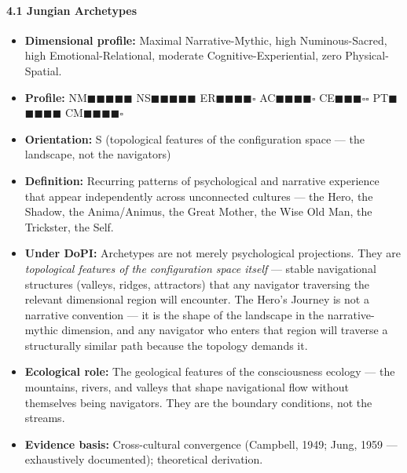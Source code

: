 \paragraph*{4.1 Jungian Archetypes}

\begin{itemize}[nosep,leftmargin=*]
  \item \textbf{Dimensional profile:} Maximal Narrative-Mythic, high Numinous-Sacred, high Emotional-Relational, moderate Cognitive-Experiential, zero Physical-Spatial.
  \item \textbf{Profile:} NM$\blacksquare$$\blacksquare$$\blacksquare$$\blacksquare$$\blacksquare$ NS$\blacksquare$$\blacksquare$$\blacksquare$$\blacksquare$$\blacksquare$ ER$\blacksquare$$\blacksquare$$\blacksquare$$\blacksquare$$\square$ AC$\blacksquare$$\blacksquare$$\blacksquare$$\blacksquare$$\square$ CE$\blacksquare$$\blacksquare$$\blacksquare$$\square$$\square$ PT$\blacksquare$$\blacksquare$$\blacksquare$$\blacksquare$$\blacksquare$ CM$\blacksquare$$\blacksquare$$\blacksquare$$\blacksquare$$\square$
  \item \textbf{Orientation:} S (topological features of the configuration space — the landscape, not the navigators)
  \item \textbf{Definition:} Recurring patterns of psychological and narrative experience that appear independently across unconnected cultures — the Hero, the Shadow, the Anima/\allowbreak Animus, the Great Mother, the Wise Old Man, the Trickster, the Self.
  \item \textbf{Under DoPI:} Archetypes are not merely psychological projections. They are \textit{topological features of the configuration space itself} — stable navigational structures (valleys, ridges, attractors) that any navigator traversing the relevant dimensional region will encounter. The Hero's Journey is not a narrative convention — it is the shape of the landscape in the narrative-mythic dimension, and any navigator who enters that region will traverse a structurally similar path because the topology demands it.
  \item \textbf{Ecological role:} The geological features of the consciousness ecology — the mountains, rivers, and valleys that shape navigational flow without themselves being navigators. They are the boundary conditions, not the streams.
  \item \textbf{Evidence basis:} Cross-cultural convergence (Campbell, 1949; Jung, 1959 — exhaustively documented); theoretical derivation.
\end{itemize}


